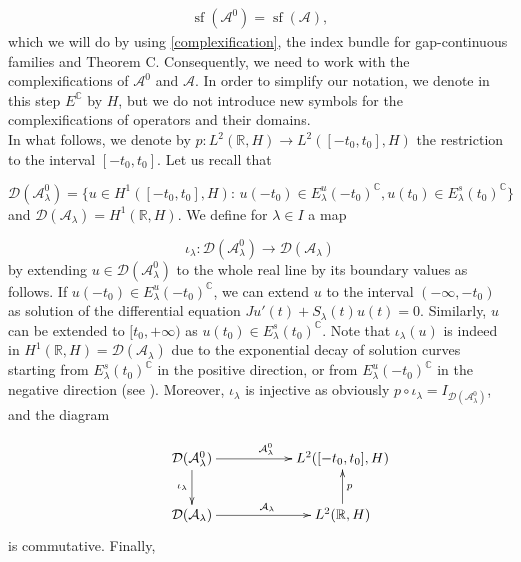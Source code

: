 \documentclass[a4paper,10pt]{article}
\DeclareMathOperator{\sfl}{sf}
\begin{document}
\begin{align}\label{A0}
\sfl(\mathcal{A}^0)=\sfl(\mathcal{A}),
\end{align}
which we will do by using \eqref{complexification}, the index bundle for gap-continuous families and Theorem C. Consequently, we need to work with the complexifications of $\mathcal{A}^0$ and $\mathcal{A}$. In order to simplify our notation, we denote in this step $E^\mathbb{C}$ by $H$, but we do not introduce new symbols for the complexifications of operators and their domains.\\
In what follows, we denote by $p:L^2(\mathbb{R},H)\rightarrow L^2([-t_0,t_0],H)$ the restriction to the interval $[-t_0,t_0]$. Let us recall that

\[\mathcal{D}(\mathcal{A}^0_\lambda)=\{u\in H^1([-t_0,t_0],H):\, u(-t_0)\in E^u_\lambda(-t_0)^\mathbb{C}, u(t_0)\in E^s_\lambda(t_0)^\mathbb{C}\}\]
and $\mathcal{D}(\mathcal{A}_\lambda)=H^1(\mathbb{R},H)$. We define for $\lambda\in I$ a map

\[\iota_\lambda:\mathcal{D}(\mathcal{A}^0_\lambda)\rightarrow\mathcal{D}(\mathcal{A}_\lambda)\]
by extending $u\in \mathcal{D}(\mathcal{A}^0_\lambda)$ to the whole real line by its boundary values as follows. If $u(-t_0)\in E^u_\lambda(-t_0)^\mathbb{C}$, we can extend $u$ to the interval $(-\infty,-t_0)$ as solution of the differential equation $Ju'(t)+S_\lambda(t)u(t)=0$. Similarly, $u$ can be extended to $[t_0,+\infty)$ as $u(t_0)\in E^s_\lambda(t_0)^\mathbb{C}$. Note that $\iota_\lambda(u)$ is indeed in $H^1(\mathbb{R},H)=\mathcal{D}(\mathcal{A}_\lambda)$ due to the exponential decay of solution curves starting from $E^s_\lambda(t_0)^\mathbb{C}$ in the positive direction, or from $E^u_\lambda(-t_0)^\mathbb{C}$ in the negative direction (see \cite[Thm. 2.1]{AlbertoODE}). Moreover, $\iota_\lambda$ is injective as obviously $p\circ\iota_\lambda=I_{\mathcal{D}(\mathcal{A}^0_\lambda)}$, and the diagram


\begin{align}\label{diagram1}
\begin{split}
\xymatrix{
&\mathcal{D}(\mathcal{A}^0_{\lambda})\ar[rr]^{\mathcal{A}^0_{\lambda}\,}\ar[d]_{\iota_\lambda}&&L^2([-t_0,t_0],H)\\
&\mathcal{D}(\mathcal{A}_{\lambda})\ar[rr]^{\mathcal{A}_{\lambda}}&&L^2(\mathbb{R},H)\ar[u]_{p}}
\end{split}
\end{align}
is commutative. Finally, 
\end{document}
